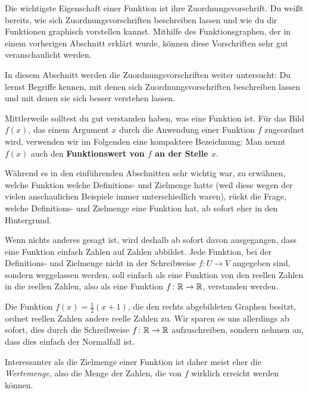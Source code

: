 \documentclass[../../main.tex]{subfiles}
\begin{document}
Die wichtigste Eigenschaft einer Funktion ist ihre Zuordnungsvorschrift. Du weißt bereits, wie sich Zuordnungsvorschriften beschreiben lassen und wie du dir Funktionen graphisch vorstellen kannst. Mithilfe des Funktionsgraphen, der in einem vorherigen Abschnitt erklärt wurde, können diese Vorschriften sehr gut veranschaulicht werden.

In diesem Abschnitt werden die Zuordnungsvorschriften weiter untersucht: Du lernst Begriffe kennen, mit denen sich Zuordnungsvorschriften beschreiben lassen und mit denen sie sich besser verstehen lassen. 

Mittlerweile solltest du gut verstanden haben, was eine Funktion ist. Für das Bild $f(x)$, das einem Argument $x$ durch die Anwendung einer Funktion $f$ zugeordnet wird, verwenden wir im Folgenden eine kompaktere Bezeichnung: Man nennt $f(x)$ auch den \textbf{Funktionswert von $f$ an der Stelle $x$}.

Während es in den einführenden Abschnitten sehr wichtig war, zu erwähnen, welche Funktion welche Definitions- und Zielmenge hatte (weil diese wegen der vielen anschaulichen Beispiele immer unterschiedlich waren), rückt die Frage, welche Definitions- und Zielmenge eine Funktion hat, ab sofort eher in den Hintergrund.

Wenn nichts anderes gesagt ist, wird deshalb ab sofort davon ausgegangen, dass eine Funktion einfach Zahlen auf Zahlen abbildet. Jede Funktion, bei der Definitions- und Zielmenge nicht in der Schreibweise $f\colon U\rightarrow V$ angegeben sind, sondern weggelassen werden, soll einfach als eine Funktion von den reellen Zahlen in die reellen Zahlen, also als eine Funktion $f\colon\mathbb{R}\rightarrow\mathbb{R}$, verstanden werden.

\begin{example}{}
    Die Funktion $f(x)=\frac{1}{2}(x+1)$, die den rechts abgebildeten Graphen besitzt, ordnet reellen Zahlen andere reelle Zahlen zu. Wir sparen es uns allerdings ab sofort, dies durch die Schreibweise $f\colon\mathbb{R}\rightarrow\mathbb{R}$ aufzuschreiben, sondern nehmen an, dass dies einfach der Normalfall ist.

    Interessanter als die Zielmenge einer Funktion ist daher meist eher die \emph{Wertemenge}, also die Menge der Zahlen, die von $f$ wirklich erreicht werden können.
\end{example}
\end{document}
